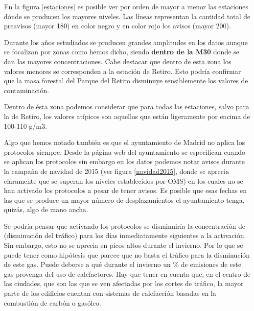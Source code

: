En la figura \ref{estaciones} es posible ver por orden de mayor a menor las estaciones dónde se producen los mayores niveles. Las líneas representan la cantidad total de preavisos (mayor 180) en color negro y en color rojo los avisos (mayor 200).



Durante los años estudiados se producen grandes amplitudes en los datos aunque se focalizan por zonas como hemos dicho, siendo \textbf{dentro de la M30} donde se dan las mayores concentraciones. Cabe destacar que dentro de esta zona los valores menores se corresponden a la estación de Retiro. Esto podría confirmar que la masa forestal del Parque del Retiro disminuye sensiblemente los valores de contaminación.

Dentro de ésta zona podemos considerar que para todas las estaciones, salvo para la de Retiro, los valores atípicos son aquellos que están ligeramente por encima de 100-110  \textmugreek  g/m3.

Algo que hemos notado también es que el ayuntamiento de Madrid no aplica los protocolos siempre. Desde la página web del ayuntamiento se especifican cuando se aplican los protocolos \cite{mambiente} sin embargo en los datos podemos notar avisos durante la campaña de navidad de 2015 (ver figura \ref{navidad2015}, donde se aprecia claramente que se superan los niveles establecidos por OMS) en los cuales no se han activado los protocolos a pesar de tener avisos. Es posible que esas fechas en las que se produce un mayor número de desplazamientos el ayuntamiento tenga, quizás, algo de mano ancha. 


Se podría pensar que activando los protocolos se disminuiría la concentración de   (disminución del tráfico) para los días inmediatamente siguientes a la activación. Sin embargo, esto no se aprecia en picos altos durante el invierno. Por lo que se puede tener como hipótesis que parece que no basta el tráfico para la disminución de este gas. Puede deberse a qué durante el invierno un \% de emisiones de este gas provenga del uso de calefactores. Hay que tener en cuenta que, en el centro de las ciudades, que son las que se ven afectadas por los cortes de tráfico, la mayor parte de los edificios cuentan con sistemas de calefacción basadas en la combustión de carbón o gasóleo.

